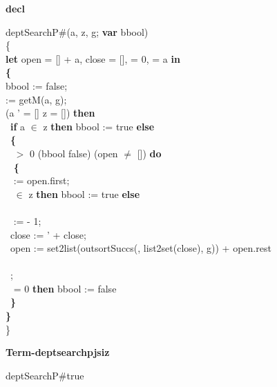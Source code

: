 {\parindent0cm


{\LARGE\bf decl}

\medskip

deptSearchP\#(a, z, g; {\bf var} bbool) \\
\{\\
{\bf let} open = [] + a, close = [],  = 0,  = a {\bf in}\\
{\bf \{}\\
\tabbe bbool := false;\\
\tabbe {} := getM(a, g);\\
 \Not (a ' = [] \Or z = []) {\bf then}\\
\tabbe \tabif\  {\bf if} a $\in$ z {\bf then} bbool := true {\bf else}\\
\tabbe \tabif\  {\bf \{}\\
\tabbe \tabif\   $>$ 0 \And (bbool \Equiv false) \And (open $\neq$ []) {\bf do}\\
\tabbe \tabif\ \tabbe {} {\bf \{}\\
\tabbe \tabif\ \tabbe {}\tabbe {} := open.first;\\
\tabbe \tabif\ \tabbe {}  $\in$ z {\bf then} bbool := true {\bf else}\\
\tabbe \tabif\ \tabbe {}\tabbe  {\bf \{}\\
\tabbe \tabif\ \tabbe {}\tabbe \tabbe {} :=  - 1;\\
\tabbe \tabif\ \tabbe {}\tabbe \tabbe close :=  ' + close;\\
\tabbe \tabif\ \tabbe {}\tabbe \tabbe open := set2list(outsortSuccs(, list2set(close), g)) + open.rest\\
\tabbe \tabif\ \tabbe {}\tabbe {\bf \}}\\
\tabbe \tabif\ \tabbe {};\\
\tabbe \tabif\   = 0 {\bf then} bbool := false\\
\tabbe \tabif\ {\bf \}}\\
{\bf \}}\\
\}

\medskip

{\LARGE\bf Term-deptsearchpjsiz}

\medskip

 \Fol \Do deptSearchP\#\Dc true

\begin{itemize}


\end{itemize}}
